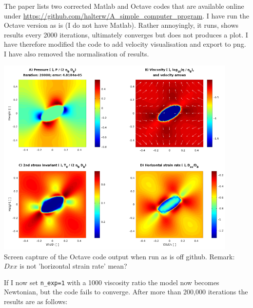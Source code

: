 The paper lists two corrected Matlab and Octave codes that are available online under
\url{https://github.com/halterw/A_simple_computer_program}.
I have run the Octave version as is (I do not have Matlab).
Rather annoyingly, it runs, shows results every 2000 iterations, ultimately converges
but does not produces a plot. 
I have therefore modified the code to add velocity visualisation and export to png.
I have also removed the normalisation of results.

\begin{center}
\includegraphics[width=12cm]{python_codes/fieldstone_142/images/octave1}\\
{\captionfont Screen capture of the Octave code output when run as is off github.
Remark: $Dxx$ is not 'horizontal strain rate' mean? }
\end{center}

If I now set \verb|n_exp=1| with a 1000 viscosity ratio the model now becomes Newtonian,
but the code fails to converge. After more than 200,000 iterations the results are as 
follows:

